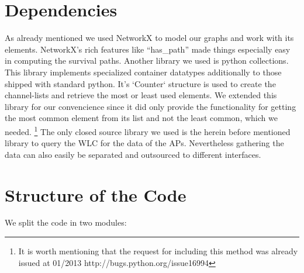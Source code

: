 \section{Dependencies}
  As already mentioned we used NetworkX\cite{hagberg-2008-exploring} to model our graphs and work with its elements.
  NetworkX's rich features like ``has\_path'' made things especially easy in computing the survival paths.
  Another library we used is python collections. \cite{python_collections}
  This library implements specialized container datatypes additionally to those shipped with standard python.
  It's `Counter` structure is used to create the channel-lists and retrieve the most or least used elements.
  We extended this library for our convencience since it did only provide the functionality for getting the most common element from its list and not the least common,
  which we needed. \footnote{It is worth mentioning that the request for including this method was already issued at 01/2013 http://bugs.python.org/issue16994}
  The only closed source library we used is the herein before mentioned library to query the WLC for the data of the APs. Nevertheless gathering the data can also
  easily be separated and outsourced to different interfaces.
\section{Structure of the Code}
  We split the code in two modules:
